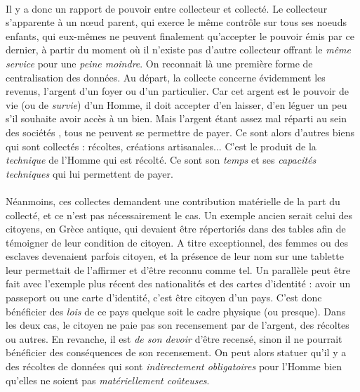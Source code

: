 \paragraph{} Il y a donc un rapport de pouvoir entre collecteur et collecté. Le collecteur s'apparente à un n\oe{}ud
parent, qui exerce le même contrôle sur tous ses noeuds enfants, qui eux-mêmes ne peuvent finalement qu'accepter
le pouvoir émis par ce dernier, à partir du moment où il n'existe pas d'autre collecteur offrant le \emph{même
service} pour une \emph{peine moindre}. On reconnait là une première forme de centralisation des données.
Au départ, la collecte concerne évidemment les revenus, l'argent d'un foyer ou d'un particulier. Car cet
argent est le pouvoir de vie (ou de \emph{survie}) d'un Homme, il doit accepter d'en laisser, d'en léguer un peu
s'il souhaite avoir accès à un bien. Mais l'argent étant assez mal réparti au sein des sociétés \cite{Richesses0},
tous ne peuvent se permettre de payer. Ce sont alors d'autres biens qui sont collectés : récoltes, créations
artisanales... C'est le produit de la \emph{technique} de l'Homme qui est récolté. Ce sont son \emph{temps} et
ses \emph{capacités techniques} qui lui permettent de payer.

\paragraph{} Néanmoins, ces collectes demandent une contribution matérielle de la part du collecté, et ce n'est pas
nécessairement le cas. Un exemple ancien serait celui des citoyens, en Grèce antique, qui devaient être répertoriés
dans des tables afin de témoigner de leur condition de citoyen. A titre exceptionnel, des femmes ou des esclaves
devenaient parfois citoyen, et la présence de leur nom sur une tablette leur permettait de l'affirmer et d'être
reconnu comme tel. Un parallèle peut être fait avec l'exemple plus récent des nationalités et des cartes d'identité :
avoir un passeport ou une carte d'identité, c'est être citoyen d'un pays. C'est donc bénéficier des \emph{lois} de ce
pays quelque soit le cadre physique (ou presque). Dans les deux cas, le citoyen ne paie pas son recensement par de l'argent,
des récoltes ou autres. En revanche, il est \emph{de son devoir} d'être recensé, sinon il ne pourrait bénéficier des 
conséquences de son recensement. On peut alors statuer qu'il y a des récoltes de données qui sont \emph{indirectement
obligatoires} pour l'Homme bien qu'elles ne soient pas \emph{matériellement coûteuses}.

